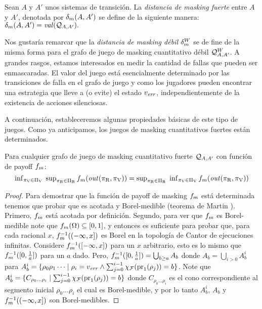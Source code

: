 \begin{definition} \label{def:mask_dist}
 Sean $A$ y $A'$ unos sistemas de transición. 
La \emph{distancia de masking fuerte} entre $A$ y $A'$, denotada por $\delta_{m}(A, A')$ se define de la siguiente manera:
$\delta_{m}(A, A') = \mathit{val}(\mathcal{Q}_{A, A'}).$
\end{definition}

	Nos gustaría remarcar que la \emph{distancia de masking débil} $\delta_{m}^W$ se de fine de la misma forma para el grafo de juego de masking cuantitativo débil $\mathcal{Q}^W_{A,A'}$.  A grandes rasgos, estamos interesados en medir la cantidad de fallas que pueden ser enmascaradas. El valor del juego está esencialmente determinado por las transiciones de falla en el grafo de juego y como los jugadores pueden encontrar una estrategia que lleve a (o evite) el estado $v_{\mathit{err}}$, independientemente de la existencia de acciones silenciosas.

A continuación, estableceremos algunas propiedades básicas de este tipo de juegos. 
Como ya anticipamos, los juegos de masking cuantitativos fuertes están determinados.

\begin{theorem} \label{thm:mask_game_det}
  Para cualquier grafo de juego de masking cuantitativo fuerte $\mathcal{Q}_{A, A'}$ con función de payoff $f_{m}$:
  \[\textstyle
  \inf_{\pi_{\mathrm{V}} \in \Pi_{\mathrm{V}}} \; \sup_{\pi_{\mathrm{R}} \in \Pi_{\mathrm{R}}} f_{m}(\mathit{out}(\pi_{\mathrm{R}}, \pi_{\mathrm{V}})) = \sup_{\pi_{\mathrm{R}} \in \Pi_{\mathrm{R}}} \;  \inf_{\pi_{\mathrm{V}} \in \Pi_{\mathrm{V}}} f_{m}(\mathit{out}(\pi_{\mathrm{R}}, \pi_{\mathrm{V}}))\]
\end{theorem}
\begin{proof} Para demostrar que la función de payoff de masking $f_{m}$ está determinada tenemos que probar que es acotada y Borel-medible (teorema de Martin \cite{Martin98}). Primero, $f_{m}$ está acotada por definición. Segundo, para ver que $f_{m}$ es Borel-medible note que $f_{m}(\Omega) \subseteq [0,1]$, y entonces es suficiente para probar que, para cada racional $x$, $f_{m}^{-1}((-\infty, x])$ es Borel en la topología de Cantor de ejecuciones infinitas. 
Considere $f_{m}^{-1}([-\infty,x])$ para un $x$ arbitrario, esto es lo mismo que $f_{m}^{-1}([0, \frac{1}{a}])$ para un $a$ dado. Pero, $f_{m}^{-1}([0, \frac{1}{a}]) = \bigcup_{b \geq a} A_b$ donde
$A_b = \bigcup_{i >0} A^i_b$ para $A^i_b = \{ \rho_0 \rho_1 \dots \mid \rho_i = v_{\mathit{err}} \wedge \sum^{i-1}_{j=0} \chi_{\mathcal{F}}(\operatorname{pr}_{1}(\rho_j)) =b\}$. Note que 
$A^i_b = \{ C_{\rho_0 \dots \rho_i} \mid \sum^{i-1}_{j=0} \chi_{\mathcal{F}}(\operatorname{pr}_{1}(\rho_j)) =b\}$ donde $C_{\rho_0 \dots \rho_i}$ es el cono correspondiente al segmento inicial 
$\rho_0 \dots \rho_i$ el cual es Borel-medible, y por lo tanto $A^i_b$, $A_b$ y $f_{m}^{-1}((-\infty, x])$ son Borel-medibles.
\qedhere
\end{proof} \\


